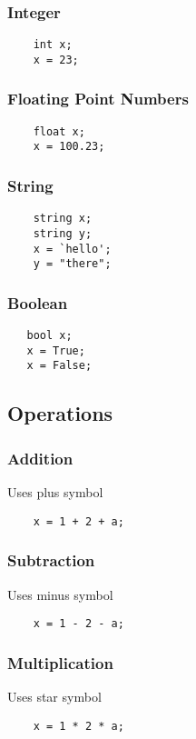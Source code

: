 \documentclass[12pt,letterpaper]{article}
\begin{document}
\subsubsection{Integer}
\begin{verbatim}
    int x;
    x = 23;
\end{verbatim}

\subsubsection{Floating Point Numbers}
\begin{verbatim}
    float x;
    x = 100.23;
\end{verbatim}

\subsubsection{String}
\begin{verbatim}
    string x;
    string y;
    x = `hello';
    y = "there";
\end{verbatim}

\subsubsection{Boolean}
\begin{verbatim}
   bool x;
   x = True;
   x = False;
\end{verbatim}

\subsection{Operations}
\subsubsection{Addition}
Uses plus symbol
\begin{verbatim}
    x = 1 + 2 + a;
\end{verbatim}

\subsubsection{Subtraction}
Uses minus symbol
\begin{verbatim}
    x = 1 - 2 - a;
\end{verbatim}


\subsubsection{Multiplication}
Uses star symbol
\begin{verbatim}
    x = 1 * 2 * a;
\end{verbatim}
\end{document}
